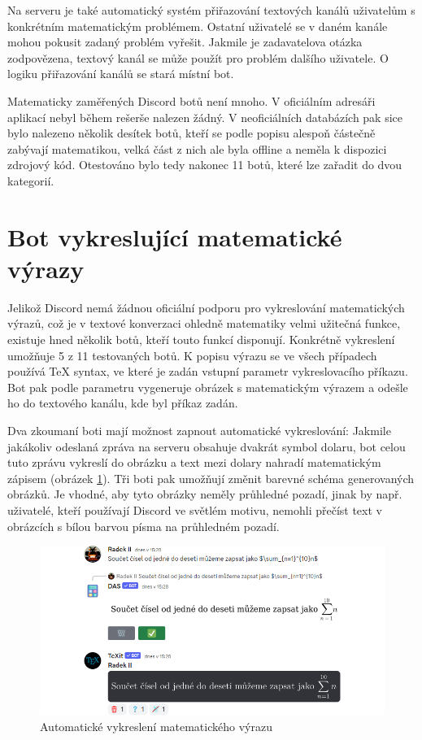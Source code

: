 \documentclass[FM]{tulthesis}
\begin{document}
	Na serveru je také automatický systém přiřazování textových kanálů uživatelům s konkrétním matematickým problémem. Ostatní uživatelé se v daném kanále mohou pokusit zadaný problém vyřešit. Jakmile je zadavatelova otázka zodpovězena, textový kanál se může použít pro problém dalšího uživatele. O logiku přiřazování kanálů se stará místní bot.
	
	Matematicky zaměřených Discord botů není mnoho. V oficiálním adresáři aplikací nebyl během rešerše nalezen žádný. V neoficiálních databázích pak sice bylo nalezeno několik desítek botů, kteří se podle popisu alespoň částečně zabývají matematikou, velká část z nich ale byla offline a neměla k dispozici zdrojový kód. Otestováno bylo tedy nakonec 11 botů, které lze zařadit do dvou kategorií.
	
	\section{Bot vykreslující matematické výrazy}\label{_tag_section_texbot}

	Jelikož Discord nemá žádnou oficiální podporu pro vykreslování matematických výrazů, což je v textové konverzaci ohledně matematiky velmi užitečná funkce, existuje hned několik botů, kteří touto funkcí disponují. Konkrétně vykreslení umožňuje 5 z 11 testovaných botů. K popisu výrazu se ve všech případech používá TeX syntax, ve které je zadán vstupní parametr vykreslovacího příkazu. Bot pak podle parametru vygeneruje obrázek s matematickým výrazem a odešle ho do textového kanálu, kde byl příkaz zadán.
	
	Dva zkoumaní boti mají možnost zapnout automatické vykreslování: Jakmile jakákoliv odeslaná zpráva na serveru obsahuje dvakrát symbol dolaru, bot celou tuto zprávu vykreslí do obrázku a text mezi dolary nahradí matematickým zápisem (obrázek \ref{_tag_img_autotex}). Tři boti pak umožňují změnit barevné schéma generovaných obrázků. Je vhodné, aby tyto obrázky neměly průhledné pozadí, jinak by např. uživatelé, kteří používají Discord ve světlém motivu, nemohli přečíst text v obrázcích s bílou barvou písma na průhledném pozadí.
	
	\begin{figure}[ht]
		\centering
		\includegraphics[width=\textwidth]{img/AutoTeX}
		\caption{Automatické vykreslení matematického výrazu}
		\label{_tag_img_autotex}
	\end{figure}
	
\end{document}

